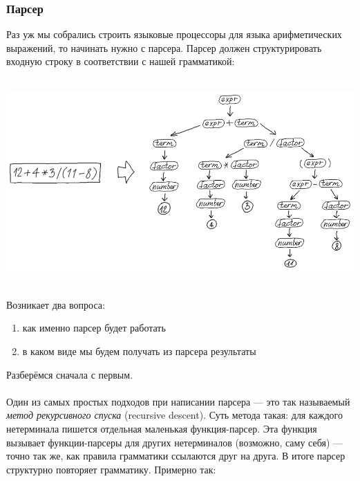 \documentclass[11pt]{book}
\begin{document}
\subsubsection{Парсер}
Раз уж мы собрались строить языковые процессоры для языка арифметических
выражений, то начинать нужно с парсера. Парсер должен структурировать входную
строку в соответствии с нашей грамматикой:
\\ \\
\includegraphics[height=3in]{pic/18.png}
\\ \\
Возникает два вопроса:
\begin{enumerate}
\item как именно парсер будет работать
\item в каком виде мы будем получать из парсера результаты
\end{enumerate}
Разберёмся сначала с первым.
\\ \\
Один из самых простых подходов при написании парсера --- это так называемый \emph{метод
рекурсивного спуска} (recursive descent). Суть метода такая: для каждого нетерминала пишется
отдельная маленькая функция-парсер. Эта функция вызывает функции-парсеры для других нетерминалов (возможно, саму себя) ---
точно так же, как правила грамматики ссылаются друг на друга. В итоге
парсер структурно повторяет грамматику. Примерно так:
\end{document}

